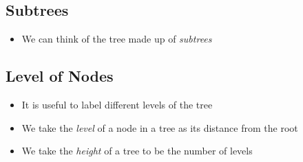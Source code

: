 
\begin{slide}
\section{Subtrees}

\begin{PauseHighLight}
  \begin{itemize}
  \item We can think of the tree made up of \emph{subtrees}
  \end{itemize}
  \begin{center}
    \pause
  \end{center}
\end{PauseHighLight}
\end{slide}


\begin{slide}
\section[-1]{Level of Nodes}

\pausebuild
\color{TwoColor}
\begin{itemize}
\item It is useful to label different levels of the tree\pauseh
\item We take the \emph{level} of a node in a tree as its distance
  from the root\pauseh
\item We take the \emph{height} of a tree to be the number of
  levels\pauseh
\end{itemize}
\begin{center}
  \pause
\end{center}

\end{slide}



\Outline %


